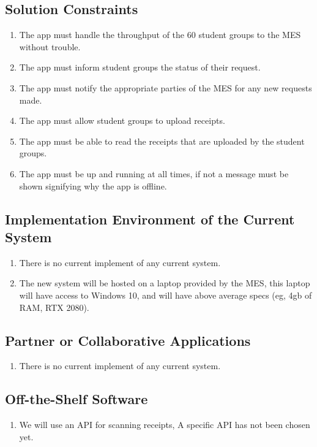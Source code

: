 \documentclass[12pt]{article}
\begin{document}
\subsection{Solution Constraints}
\begin{enumerate}
  \item The app must handle the throughput of the 60 student groups to the MES without trouble.
  \item The app must inform student groups the status of their request. 
  \item The app must notify the appropriate parties of the MES for any new requests made.
  \item The app must allow student groups to upload receipts. 
  \item The app must be able to read the receipts that are uploaded by the student groups. 
  \item The app must be up and running at all times, if not a message must be shown signifying why the app is offline. 
\end{enumerate}
\subsection{Implementation Environment of the Current System}
\begin{enumerate}
  \item There is no current implement of any current system.
  \item The new system will be hosted on a laptop provided by the MES, this laptop will have access to Windows 10, and will have above average specs (eg, 4gb of RAM, RTX 2080).
\end{enumerate}
\subsection{Partner or Collaborative Applications}
\begin{enumerate}
  \item There is no current implement of any current system.
\end{enumerate}
\subsection{Off-the-Shelf Software}
\begin{enumerate}
  \item We will use an API for scanning receipts, A specific API has not been chosen yet.
\end{enumerate}
\end{document}
